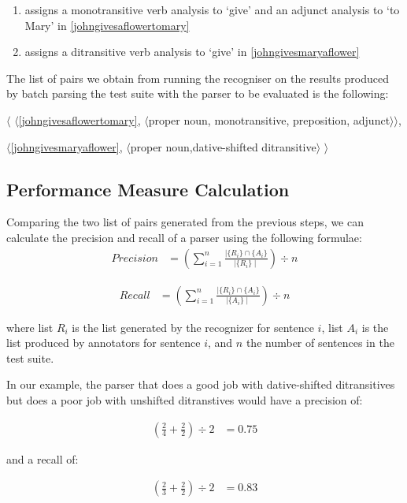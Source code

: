 \documentclass[11pt]{article}
\def\<{$\langle$}
\def\>{$\rangle$}
\begin{document}
\begin{enumerate}
\item assigns a monotransitive verb analysis to `give' and an adjunct analysis to `to Mary' in \ref{johngivesaflowertomary}

\item assigns a ditransitive verb analysis to `give' in  \ref{johngivesmaryaflower} 
\end{enumerate}


The list of pairs we obtain from running the recogniser on the results produced by batch parsing the test suite with the parser to be evaluated is the following:

 \< \<\ref{johngivesaflowertomary}, \<proper noun, monotransitive, preposition, adjunct\>\>, 

\hspace{1.5mm}\<\ref{johngivesmaryaflower}, \<proper noun,dative-shifted ditransitive\> \>

\subsection{Performance Measure Calculation}

Comparing the two list of pairs generated from the previous steps, we can calculate the precision and recall of a parser using the following formulae:
\begin{align}
          Precision &= (\sum_{i=1}^n \frac{\mid\{R_{i}\}\cap\{A_{i}\}}{\mid\{R_{i}\}\mid})\div n
\end{align}

\begin{align}
          Recall &= (\sum_{i=1}^n \frac{\mid\{R_{i}\}\cap\{A_{i}\}}{\mid\{A_{i}\}\mid})\div n
\end{align}

\noindent where list $R_i$  is the list generated by the recognizer for sentence $i$, list $A_{i}$ is the list produced by annotators for sentence $i$, and $n$ the number of sentences in the test suite.

In our example, the parser that does a good job with dative-shifted ditransitives but does a poor job with unshifted ditranstives would have a precision of:

 \begin{align*}
            (\frac{2}{4} + \frac{2}{2})\div 2 &= 0.75
\end{align*}

\noindent and a recall of:

 \begin{align*}
            (\frac{2}{3} + \frac{2}{2})\div 2 &= 0.83
\end{align*}
\end{document}
